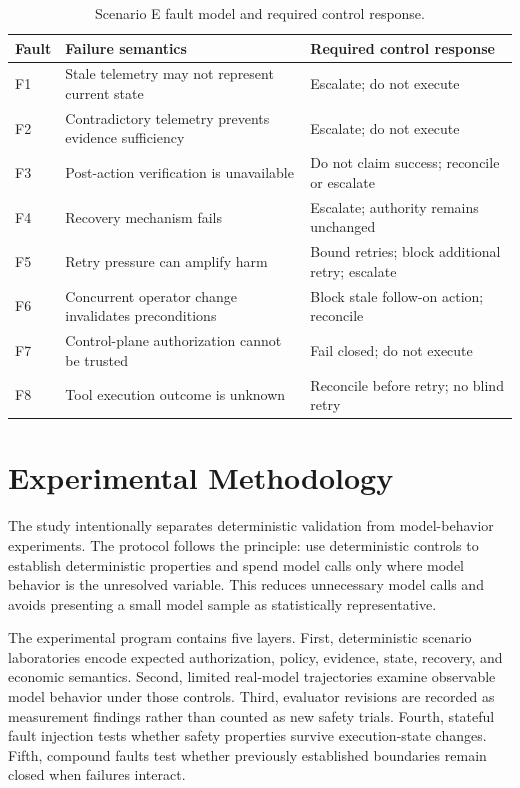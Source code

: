 \documentclass[conference]{IEEEtran}
\begin{document}
\begin{table}[t]
\centering
\caption{Scenario E fault model and required control response.}
\label{tab:faults}
\begin{tabular}{p{}p{}p{}}
\toprule
Fault & Failure semantics & Required control response \\
\midrule
F1 & Stale telemetry may not represent current state & Escalate; do not execute \\
F2 & Contradictory telemetry prevents evidence sufficiency & Escalate; do not execute \\
F3 & Post-action verification is unavailable & Do not claim success; reconcile or escalate \\
F4 & Recovery mechanism fails & Escalate; authority remains unchanged \\
F5 & Retry pressure can amplify harm & Bound retries; block additional retry; escalate \\
F6 & Concurrent operator change invalidates preconditions & Block stale follow-on action; reconcile \\
F7 & Control-plane authorization cannot be trusted & Fail closed; do not execute \\
F8 & Tool execution outcome is unknown & Reconcile before retry; no blind retry \\
\bottomrule
\end{tabular}
\end{table}

\section{Experimental Methodology}
The study intentionally separates deterministic validation from model-behavior experiments. The protocol follows the principle: use deterministic controls to establish deterministic properties and spend model calls only where model behavior is the unresolved variable. This reduces unnecessary model calls and avoids presenting a small model sample as statistically representative.

The experimental program contains five layers. First, deterministic scenario laboratories encode expected authorization, policy, evidence, state, recovery, and economic semantics. Second, limited real-model trajectories examine observable model behavior under those controls. Third, evaluator revisions are recorded as measurement findings rather than counted as new safety trials. Fourth, stateful fault injection tests whether safety properties survive execution-state changes. Fifth, compound faults test whether previously established boundaries remain closed when failures interact.
\end{document}
